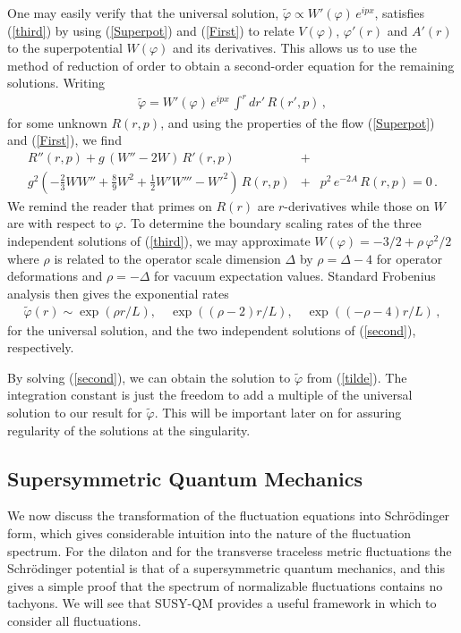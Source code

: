 \documentclass[a4paper,12pt]{article}
\def\varphit{\tilde{\varphi}}
\begin{document}
One may easily verify that the universal solution, $\varphit \propto
W'(\varphi) \, e^{ipx}$, satisfies (\ref{third}) by using
(\ref{Superpot}) and (\ref{First}) to relate $V(\varphi)$, $\varphi'(r)$ and
$A'(r)$ to the superpotential $W(\varphi)$ and its derivatives. 
This allows us to use the method of
reduction of order to obtain a second-order equation for the remaining
solutions.  Writing
\begin{eqnarray}
\label{tilde}
\varphit = W'(\varphi) \, e^{ipx} \, \int^r dr' \, R(r',p) \,,
\end{eqnarray}
for some unknown $R(r,p)$, and using the properties of the flow
(\ref{Superpot}) and (\ref{First}), we find
\begin{eqnarray}
\label{second}
R''(r,p) + g \, (W'' - 2W) \, R'(r,p) &+& \\
g^2  \left( -\frac{2}{3} W W'' + \frac{8}{9}
W^2 + \frac{1}{2} W' W''' - W'^2 \right) \, R(r,p) &+& p^2 \, e^{-2A} \,
R(r,p) = 0 \,. \nonumber
\end{eqnarray}
We remind the reader that primes on $R(r)$ are $r$-derivatives while
those on $W$ are with respect to $\varphi$. To determine the boundary
scaling rates of the three independent solutions of (\ref{third}), we
may approximate $W(\varphi) = -3/2 + \rho \, \varphi^2/2$ where
$\rho$ is related to the operator scale dimension $\Delta$ by
$\rho=\Delta-4$ for operator deformations and $\rho=-\Delta$ for
vacuum expectation values. Standard Frobenius analysis then gives the
exponential rates
\begin{eqnarray}
\varphit(r) \sim \exp(\rho r/L), \quad \exp((\rho-2)r/L), \quad
\exp((-\rho-4)r/L) \,,
\end{eqnarray}
for the universal solution, and the two independent solutions of
(\ref{second}), respectively.

By solving (\ref{second}), we can obtain the solution to $\varphit$
from (\ref{tilde}).  The integration constant is just the freedom to
add a multiple of the universal solution to our result for $\varphit$.
This will be important later on for assuring regularity of the
solutions at the singularity.

\subsection{Supersymmetric Quantum Mechanics}

We now discuss the transformation of the fluctuation equations into
Schr\"odinger form, which gives considerable intuition \cite{fgpw2}
into the nature of the fluctuation spectrum.  For the dilaton and for
the transverse traceless metric fluctuations \cite{dfgk,bakas} the
Schr\"odinger potential is that of a supersymmetric quantum mechanics,
and this gives a simple proof that the spectrum of normalizable
fluctuations contains no tachyons.  We will see that SUSY-QM provides
a useful framework in which to consider all fluctuations.
\end{document}
